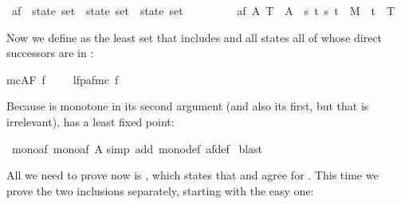 \begin{isabellebody}
\begin{isamarkuptext}
\end{isamarkuptext}%
\isamarkuptrue%
\ af\ {\isacharcolon}{\isacharcolon}\ {\isachardoublequote}state\ set\ {\isasymRightarrow}\ state\ set\ {\isasymRightarrow}\ state\ set{\isachardoublequote}\isanewline
\ \ \ \ \ \ \ \ \ {\isachardoublequote}af\ A\ T\ {\isasymequiv}\ A\ {\isasymunion}\ {\isacharbraceleft}s{\isachardot}\ {\isasymforall}t{\isachardot}\ {\isacharparenleft}s{\isacharcomma}\ t{\isacharparenright}\ {\isasymin}\ M\ {\isasymlongrightarrow}\ t\ {\isasymin}\ T{\isacharbraceright}{\isachardoublequote}\isamarkupfalse%
%
\begin{isamarkuptext}%
\noindent
Now we define  as the least set  that includes
 and all states all of whose direct successors are in :%
\end{isamarkuptext}%
\isamarkuptrue%
\isamarkupfalse%
{\isachardoublequote}mc{\isacharparenleft}AF\ f{\isacharparenright}\ \ \ \ {\isacharequal}\ lfp{\isacharparenleft}af{\isacharparenleft}mc\ f{\isacharparenright}{\isacharparenright}{\isachardoublequote}\isamarkupfalse%
%
\begin{isamarkuptext}%
\noindent
Because  is monotone in its second argument (and also its first, but
that is irrelevant),  has a least fixed point:%
\end{isamarkuptext}%
\isamarkuptrue%
\ mono{\isacharunderscore}af{\isacharcolon}\ {\isachardoublequote}mono{\isacharparenleft}af\ A{\isacharparenright}{\isachardoublequote}\isanewline
\isamarkupfalse%
simp\ add{\isacharcolon}\ mono{\isacharunderscore}def\ af{\isacharunderscore}def{\isacharparenright}\isanewline
\isamarkupfalse%
\ blast\isanewline
\isamarkupfalse%
\isamarkupfalse%
\isamarkupfalse%
\isamarkupfalse%
\isamarkupfalse%
\isamarkupfalse%
\isamarkupfalse%
\isamarkupfalse%
\isamarkupfalse%
\isamarkupfalse%
\isamarkupfalse%
\isamarkupfalse%
\isamarkupfalse%
\isamarkupfalse%
\isamarkupfalse%
\isamarkupfalse%
\isamarkupfalse%
\isamarkupfalse%
\isamarkupfalse%
\isamarkupfalse%
%
\begin{isamarkuptext}%
All we need to prove now is  , which states
that  and \isa{{\isasymTurnstile}} agree for \@.
This time we prove the two inclusions separately, starting
with the easy one:%

\end{isamarkuptext}
\end{isabellebody}
